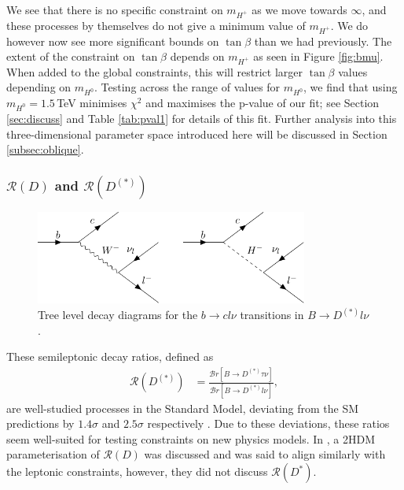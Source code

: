 \documentclass[a4paper,12pt]{article}
\begin{document}
We see that there is no specific constraint on $m_{H^+}$ as we move towards $\infty$, and these processes by themselves do not give a minimum value of $m_{H^+}$. 
We do however now see more significant bounds on $\tan\beta$ than we had previously. 
The extent of the constraint on $\tan\beta$ depends on $m_{H^+}$ as seen in Figure \ref{fig:bmu}.
When added to the global constraints, this will restrict larger $\tan\beta$ values depending on $m_{H^0}$.
Testing across the range of values for $m_{H^0}$, we find that using $m_{H^0}=1.5\,$TeV minimises $\chi^2$ and maximises the p-value of our fit; see Section \ref{sec:discuss} and Table \ref{tab:pval1} for details of this fit.
Further analysis into this three-dimensional parameter space introduced here will be discussed in Section \ref{subsec:oblique}.

\subsubsection{$\mathcal{R}(D)$ and $\mathcal{R}(D^{(*)})$}
\begin{figure}[H]
    \centering
    \includegraphics[width=0.8\textwidth]{bclnu.pdf}
    \caption{\label{fig:bclnu}Tree level decay diagrams for the $b\to cl\nu$ transitions in $B\to D^{(*)}l\nu$.}
\end{figure}
These semileptonic decay ratios, defined as
\begin{align}
    \mathcal{R}(D^{(*)}) &=\frac{\mathcal{B}r[B\to D^{(*)}\tau\nu]}{\mathcal{B}r[B\to D^{(*)}l\nu]},
\end{align}
are well-studied processes in the Standard Model, deviating from the SM predictions by $1.4\sigma$ and $2.5\sigma$ respectively \cite{pdg}. 
Due to these deviations, these ratios seem well-suited for testing constraints on new physics models. 
In \cite{desc}, a 2HDM parameterisation of $\mathcal{R}(D)$ was discussed and was said to align similarly with the leptonic constraints, however, they did not discuss $\mathcal{R}(D^*)$. 
\end{document}
